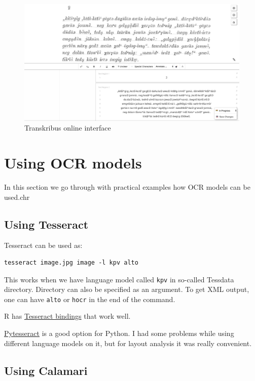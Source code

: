 \documentclass[]{book}
\begin{document}
\begin{figure}
\centering
\includegraphics{images/transkribus_interface.jpg}
\caption{Transkribus online interface}
\end{figure}

\hypertarget{using-models}{%
\chapter{Using OCR models}\label{using-models}}

In this section we go through with practical examples how OCR models can be used.chr

\hypertarget{using-tesseract}{%
\section{Using Tesseract}\label{using-tesseract}}

Tesseract can be used as:

\begin{verbatim}
tesseract image.jpg image -l kpv alto
\end{verbatim}

This works when we have language model called \texttt{kpv} in so-called Tessdata directory. Directory can also be specified as an argument. To get XML output, one can have \texttt{alto} or \texttt{hocr} in the end of the command.

R has \href{https://docs.ropensci.org/tesseract/}{Tesseract bindings} that work well.

\href{https://pypi.org/project/pytesseract/}{Pytesseract} is a good option for Python. I had some problems while using different language models on it, but for layout analysis it was really convenient.

\hypertarget{using-calamari}{%
\section{Using Calamari}\label{using-calamari}}
\end{document}

